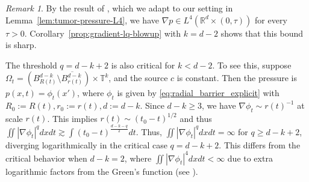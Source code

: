 \documentclass[11pt]{amsart}
\numberwithin{equation}{section}
\numberwithin{figure}{section}
\theoremstyle{plain}
\theoremstyle{definition}
\theoremstyle{remark}
\newtheorem{rem}[thm]{Remark}
\theoremstyle{plain}
\def\R{\mathbb{R}}
\begin{document}
\begin{rem}\label{rem:lq-sharpness}
By the result of \cite{DavidPerthame}, which we adapt to our setting in Lemma~\ref{lem:tumor-pressure-L4}, we have $\nabla p\in L^4(\R^d\times (0,\tau))$ for every $\tau > 0$. Corollary~\ref{prop:gradient-lq-blowup} with $k = d-2$ shows that this bound is sharp.

The threshold $q= d-k+2$ is also critical for $k < d-2$. To see this, suppose $\Omega_t=(B_{R(t)}^{d-k}\setminus \overline{B_{r(t)}^{d-k}})\times \mathbb{T}^k$, and the source $c$ is constant. Then the pressure is $p(x,t) = \phi_t(x')$, where $\phi_t$ is given by \eqref{eq:radial_barrier_explicit} with $R_0 := R(t), r_0 := r(t), d:= d-k$. Since $d-k \geq 3$, we have $\nabla \phi_t \sim r(t)^{-1}$ at scale $r(t)$. This implies $r(t) \sim (t_0 - t)^{1/2}$ and thus $\iint |\nabla \phi_t|^qdxdt \gtrsim \int (t_0-t)^{\frac{d-k-q}{2}}dt$. Thus, $\iint |\nabla \phi_t|^{q}dxdt = \infty$ for $q\geq d-k+2$, diverging logarithmically in the critical case $q = d-k+2$. This differs from the critical behavior when $d-k = 2$, where $\iint |\nabla \phi_t|^4dxdt < \infty$ due to extra logarithmic factors from the Green's function (see \cite[Appendix C]{DavidPerthame}).
\end{rem}
\end{document}

